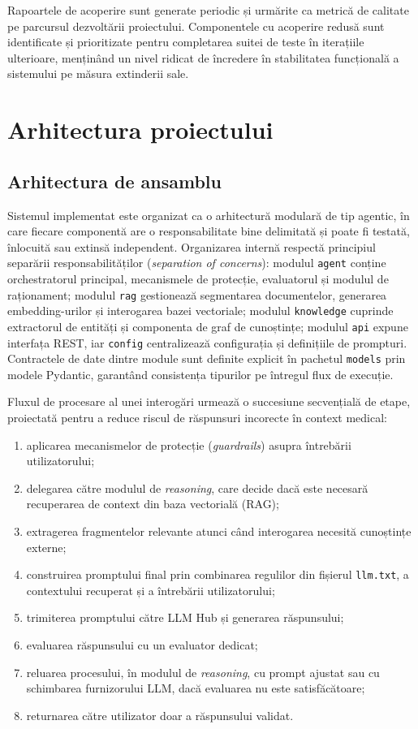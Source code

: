 \documentclass[12pt, a4paper, oneside, romanian]{teza-upb}
\begin{document}
Rapoartele de acoperire sunt generate periodic și urmărite ca metrică de calitate pe parcursul dezvoltării proiectului. Componentele cu acoperire redusă sunt identificate și prioritizate pentru completarea suitei de teste în iterațiile ulterioare, menținând un nivel ridicat de încredere în stabilitatea funcțională a sistemului pe măsura extinderii sale.

\chapter{Arhitectura proiectului}

\section{Arhitectura de ansamblu}

Sistemul implementat este organizat ca o arhitectură modulară de tip agentic, în care fiecare componentă are o responsabilitate bine delimitată și poate fi testată, înlocuită sau extinsă independent. Organizarea internă respectă principiul separării responsabilităților (\textit{separation of concerns}): modulul \texttt{agent} conține orchestratorul principal, mecanismele de protecție, evaluatorul și modulul de raționament; modulul \texttt{rag} gestionează segmentarea documentelor, generarea embedding-urilor și interogarea bazei vectoriale; modulul \texttt{knowledge} cuprinde extractorul de entități și componenta de graf de cunoștințe; modulul \texttt{api} expune interfața REST, iar \texttt{config} centralizează configurația și definițiile de prompturi. Contractele de date dintre module sunt definite explicit în pachetul \texttt{models} prin modele Pydantic, garantând consistența tipurilor pe întregul flux de execuție.

Fluxul de procesare al unei interogări urmează o succesiune secvențială de etape, proiectată pentru a reduce riscul de răspunsuri incorecte în context medical:

\begin{enumerate}
    \item aplicarea mecanismelor de protecție (\textit{guardrails}) asupra întrebării utilizatorului;
    \item delegarea către modulul de \textit{reasoning}, care decide dacă este necesară recuperarea de context din baza vectorială (RAG);
    \item extragerea fragmentelor relevante atunci când interogarea necesită cunoștințe externe;
    \item construirea promptului final prin combinarea regulilor din fișierul \texttt{llm.txt}, a contextului recuperat și a întrebării utilizatorului;
    \item trimiterea promptului către LLM Hub și generarea răspunsului;
    \item evaluarea răspunsului cu un evaluator dedicat;
    \item reluarea procesului, în modulul de \textit{reasoning}, cu prompt ajustat sau cu schimbarea furnizorului LLM, dacă evaluarea nu este satisfăcătoare;
    \item returnarea către utilizator doar a răspunsului validat.
\end{enumerate}
\end{document}
